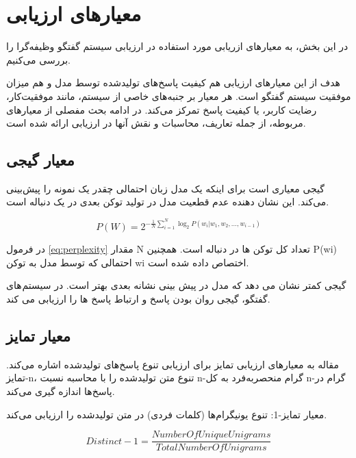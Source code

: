 \section{معیارهای ارزیابی}
در این بخش، به معیارهای ازریابی مورد استفاده در ارزیابی سیستم گفتگو وظیفه‌گرا را بررسی می‌کنیم.

هدف از این معیارهای ارزیابی هم کیفیت پاسخ‌های تولید‌شده توسط مدل و هم میزان موفقیت سیستم گفتگو است. هر معیار بر جنبه‌های خاصی از سیستم، مانند موفقیت‌کار، رضایت کاربر، یا کیفیت پاسخ تمرکز می‌کند. در ادامه بحث مفصلی از معیارهای مربوطه، از جمله تعاریف، محاسبات و نقش آنها در ارزیابی ارائه شده است.

\subsection[معیار گیجی]{معیار گیجی}

گیجی معیاری است برای اینکه یک مدل زبان احتمالی چقدر یک نمونه را پیش‌بینی می‌کند. این نشان دهنده عدم قطعیت مدل در تولید توکن بعدی در یک دنباله است.

\begin{equation}
\label{eq:perplexity}
P(W) = 2^{-\frac{1}{N} \sum_{i=1}^{N} \log_2 P(w_i | w_1, w_2, \ldots, w_{i-1})}
\end{equation}

در فرمول
\ref{eq:perplexity}
مقدار N  تعداد کل توکن ها در دنباله است.
همچنین P(wi) احتمالی که توسط مدل به توکن wi اختصاص داده شده است.


 گیجی کمتر نشان می دهد که مدل در پیش بینی نشانه بعدی بهتر است. در سیستم های گفتگو، گیجی روان بودن پاسخ و ارتباط پاسخ ها را ارزیابی می کند.

\subsection[معیار تمایز]{معیار تمایز}

مقاله%
\cite{li2015diversity}
به معیارهای ارزیابی تمایز برای ارزیابی تنوع پاسخ‌های تولید‌شده اشاره می‌کند. تمایز-n، تنوع متن تولیدشده را با محاسبه نسبت n-گرام منحصر‌به‌فرد به کل n-گرام در پاسخ‌ها اندازه گیری می‌کند.


معیار تمایز-1: تنوع یونیگرام‌ها (کلمات فردی) در متن تولیدشده را ارزیابی می‌کند.
\begin{LTR}
\begin{equation}
Distinct-1 = \frac{NumberOfUniqueUnigrams}{TotalNumberOfUnigrams}
\end{equation}
\end{LTR}

